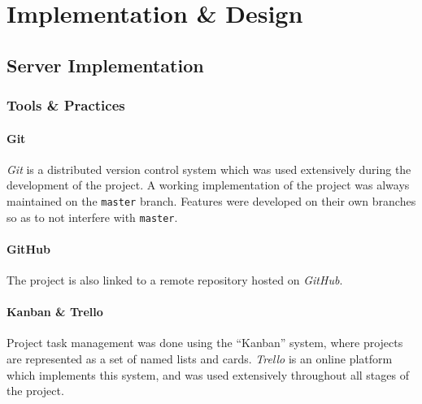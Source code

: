 \documentclass{l4proj}
\newcommand{\code}[1]{\texttt{#1}}
\begin{document}
        





\chapter{Implementation \& Design}

                    

\section{Server Implementation}

    \subsection{Tools \& Practices}
    
             \subsubsection{Git}
         \textit{Git} is a distributed version control system which was used extensively during the development of the project. A working implementation of the project was always maintained on the \code{master} branch. Features were developed on their own branches so as to not interfere with \code{master}.
         
             \subsubsection{GitHub}
             The project is also linked to a remote repository hosted on \textit{GitHub}.
             
             \subsubsection{Kanban \& Trello}
             Project task management was done using the ``Kanban'' system, where projects are represented as a set of named lists and cards. \textit{Trello} is an online platform which implements this system, and was used extensively throughout all stages of the project.
         
\end{document}

